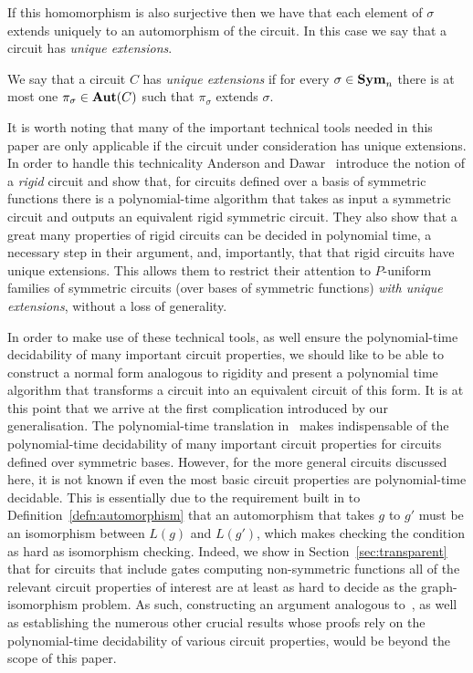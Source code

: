 \documentclass[../paper.tex]{subfiles}
\begin{document}
If this homomorphism is also surjective then we have that each element of
$\sigma$ extends uniquely to an automorphism of the circuit. In this case we say
that a circuit has \emph{unique extensions}.

\begin{definition}
  We say that a circuit $C$ has \emph{unique extensions} if for every $\sigma
  \in \text{\textbf{Sym}}_n$ there is at most one $\pi_{\sigma} \in \text{\textbf{Aut}}(C)$ such that
  $\pi_{\sigma}$ extends $\sigma$.
\end{definition}

It is worth noting that many of the important technical tools needed in this
paper are only applicable if the circuit under consideration has unique
extensions. In order to handle this technicality Anderson and
Dawar~\cite{AndersonD17} introduce the notion of a \emph{rigid} circuit and show
that, for circuits defined over a basis of symmetric functions there is a
polynomial-time algorithm that takes as input a symmetric circuit and outputs an
equivalent rigid symmetric circuit. They also show that a great many properties
of rigid circuits can be decided in polynomial time, a necessary step in their
argument, and, importantly, that that rigid circuits have unique extensions.
This allows them to restrict their attention to $P$-uniform families of
symmetric circuits (over bases of symmetric functions) \emph{with unique
  extensions}, without a loss of generality.

In order to make use of these technical tools, as well ensure the
polynomial-time decidability of many important circuit properties, we should
like to be able to construct a normal form analogous to rigidity and present a
polynomial time algorithm that transforms a circuit into an equivalent circuit
of this form.  It is at this point that we arrive at the first complication
introduced by our generalisation. The polynomial-time
translation in~\cite{AndersonD17} makes indispensable of the polynomial-time decidability of many
important circuit properties for circuits defined over symmetric
bases.  However,
for the more general circuits discussed here, it is not known if even the most
basic circuit properties are polynomial-time decidable.  This is
essentially due to the requirement built in to
Definition~\ref{defn:automorphism} that an automorphism that takes $g$
to $g'$ must be an isomorphism between $L(g)$ and $L(g')$, which makes
checking the condition as hard as isomorphism checking.
Indeed, we show in
Section~\ref{sec:transparent} that for circuits that include gates computing
non-symmetric functions all of the relevant circuit properties of interest are
at least as hard to decide as the graph-isomorphism problem. As such,
constructing an argument analogous to~\cite{AndersonD17}, as well as establishing the numerous other
crucial results whose proofs rely on the polynomial-time decidability of various
circuit properties, would be beyond the scope of this paper.
\end{document}
